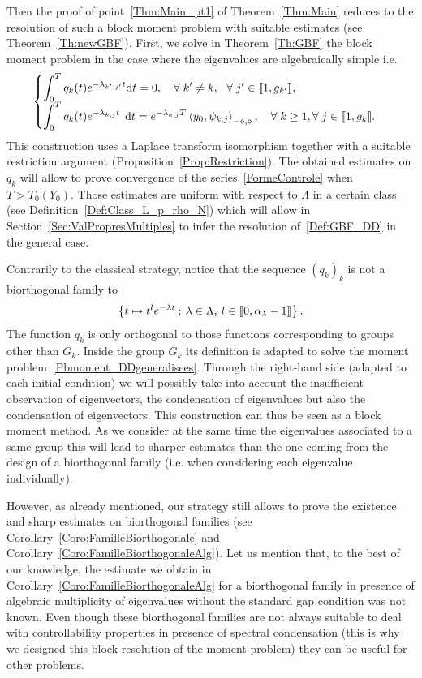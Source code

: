 \documentclass[AHL,Unicode,longabstracts]{cedram}
\newcommand{\llbracket}{\mathopen{[\mkern -2.7mu[}}
\newcommand{\rrbracket}{\mathclose{]\mkern -2.7mu]}}
\newcommand{\inter}[2]{\llbracket #1,#2 \rrbracket}
\newcommand{\Fzp}{Y_0}
\newcommand{\dual}[2]{\left\langle #1, #2 \right\rangle_{-\diamond,\diamond}}
\newcommand{\n}{g}
\newcommand{\md}{\mathrm{d}}
\let\oldforall\forall
\renewcommand*{\forall}{\mathrel{\oldforall}}
\begin{document}
Then the proof of point~\eqref{Thm:Main_pt1} of Theorem~\ref{Thm:Main} reduces to the resolution of such a block moment problem with suitable estimates (see Theorem~\ref{Th:newGBF}). First, we solve in Theorem~\ref{Th:GBF} the block moment problem in the case where the eigenvalues are algebraically simple i.e.
\begin{equation}\label{Def:GBF}
\begin{cases}
\displaystyle\int_0^T q_k(t) e^{-\lambda_{k',j'} t} \md t = 0, \quad \forall k' \neq k, \ \ \forall j'\in \inter{1}{\n_{k'}},
\\[0.15em]
\displaystyle \int_0^T q_k(t) e^{-\lambda_{k,j} t} \;\,\md t = e^{-\lambda_{k,j}T} \dual{y_0}{\psi_{k,j}}, \quad \forall k \geq 1, \forall j \in \inter{1}{\n_k}.
\end{cases}
\end{equation}
This construction uses a Laplace transform isomorphism together with a suitable restriction argument (Proposition~\ref{Prop:Restriction}). The obtained estimates on $q_k$ will allow to prove convergence of the series~\eqref{FormeControle} when $T>T_0(\Fzp)$. Those estimates are uniform with respect to $\Lambda$ in a certain class (see Definition~\ref{Def:Class_L_p_rho_N}) which will allow in Section~\ref{Sec:ValPropresMultiples} to infer the resolution of~\eqref{Def:GBF_DD} in the general case.

\begin{rema}
Contrarily to the classical strategy, notice that the sequence $(q_k)_k$ is not a biorthogonal family to
\[
\left\{ t \mapsto t^l e^{-\lambda t} \: ; \: \lambda \in \Lambda, \: l \in \inter{0}{\alpha_\lambda -1} \right\}.
\]
The function $q_k$ is only orthogonal to those functions corresponding to groups other than $G_k$. Inside the group $G_k$ its definition is adapted to solve the moment problem~\eqref{Pbmoment_DDgeneralisees}. Through the right-hand side (adapted to each initial condition) we will possibly take into account the insufficient observation of eigenvectors, the condensation of eigenvalues but also the condensation of eigenvectors. This construction can thus be seen as a block moment method. As we consider at the same time the eigenvalues associated to a same group this will lead to sharper estimates than the one coming from the design of a biorthogonal family (i.e. when considering each eigenvalue individually).

However, as already mentioned, our strategy still allows to prove the existence and sharp estimates on biorthogonal families (see Corollary~\ref{Coro:FamilleBiorthogonale} and Corollary~\ref{Coro:FamilleBiorthogonaleAlg}). Let us mention that, to the best of our knowledge, the estimate we obtain in Corollary~\ref{Coro:FamilleBiorthogonaleAlg} for a biorthogonal family in presence of algebraic multiplicity of eigenvalues without the standard gap condition was not known. Even though these biorthogonal families are not always suitable to deal with controllability properties in presence of spectral condensation (this is why we designed this block resolution of the moment problem) they can be useful for other problems.
\end{rema}
\end{document}
